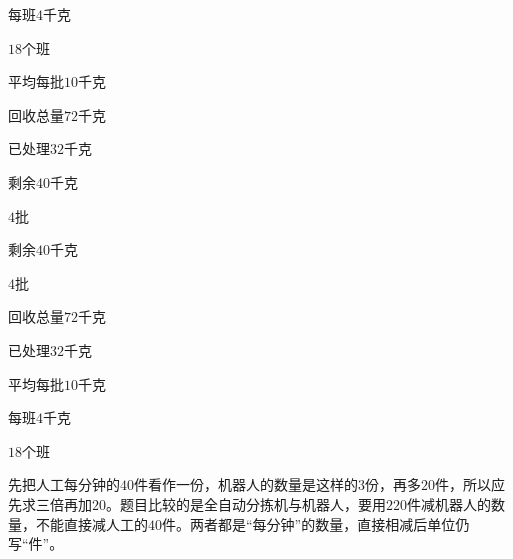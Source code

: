 \documentclass[multi=snippet,border=0pt]{standalone}
\newenvironment{snippet}[3]{\begin{minipage}{#1bp}\color{answerred}\fontsize{#2}{#3}\selectfont\raggedright}{\end{minipage}}
\begin{document}
\begin{snippet}{69.80000000000001}{8.5}{12.8}每班\(4\)千克\end{snippet}
\begin{snippet}{69.54999999999998}{8.5}{12.8}\(18\)个班\end{snippet}
\begin{snippet}{68.79999999999995}{8.5}{12.8}平均每批\(10\)千克\end{snippet}
\begin{snippet}{69.80000000000001}{8.5}{12.8}回收总量\(72\)千克\end{snippet}
\begin{snippet}{69.04999999999998}{8.5}{12.8}已处理\(32\)千克\end{snippet}
\begin{snippet}{72.54999999999995}{8.5}{12.8}剩余\(40\)千克\end{snippet}
\begin{snippet}{69.04999999999995}{8.5}{12.8}\(4\)批\end{snippet}
\begin{snippet}{77.05000000000001}{8.5}{12.8}剩余\(40\)千克\end{snippet}
\begin{snippet}{69.29999999999998}{8.5}{12.8}\(4\)批\end{snippet}
\begin{snippet}{72.29999999999995}{8.5}{12.8}回收总量\(72\)千克\end{snippet}
\begin{snippet}{69.29999999999995}{8.5}{12.8}已处理\(32\)千克\end{snippet}
\begin{snippet}{69.54999999999998}{8.5}{12.8}平均每批\(10\)千克\end{snippet}
\begin{snippet}{72.79999999999995}{8.5}{12.8}每班\(4\)千克\end{snippet}
\begin{snippet}{69.04999999999995}{8.5}{12.8}\(18\)个班\end{snippet}
\begin{snippet}{505}{11.5}{14}先把人工每分钟的\(40\)件看作一份，机器人的数量是这样的\(3\)份，再多\(20\)件，所以应先求三倍再加\(20\)。题目比较的是全自动分拣机与机器人，要用\(220\)件减机器人的数量，不能直接减人工的\(40\)件。两者都是“每分钟”的数量，直接相减后单位仍写“件”。\end{snippet}
\end{document}
